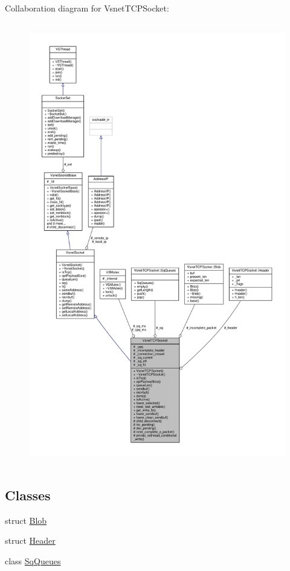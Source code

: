 Collaboration diagram for Vsnet\+T\+C\+P\+Socket\+:
\nopagebreak
\begin{figure}[H]
\begin{center}
\leavevmode
\includegraphics[height=550pt]{d1/d91/classVsnetTCPSocket__coll__graph}
\end{center}
\end{figure}
\subsection*{Classes}
\begin{DoxyCompactItemize}
\item 
struct \hyperlink{structVsnetTCPSocket_1_1Blob}{Blob}
\item 
struct \hyperlink{structVsnetTCPSocket_1_1Header}{Header}
\item 
class \hyperlink{classVsnetTCPSocket_1_1SqQueues}{Sq\+Queues}
\end{DoxyCompactItemize}
